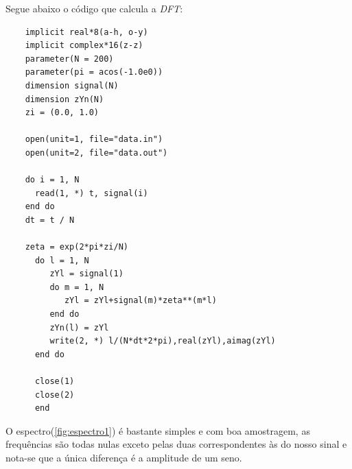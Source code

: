 \documentclass[a4paper, 11pt]{article}
\begin{document}
Segue abaixo o código que calcula a \emph{DFT}:
\begin{verbatim}
    implicit real*8(a-h, o-y)
    implicit complex*16(z-z)
    parameter(N = 200)
    parameter(pi = acos(-1.0e0))
    dimension signal(N)
    dimension zYn(N)
    zi = (0.0, 1.0)
    
    open(unit=1, file="data.in")
    open(unit=2, file="data.out")
    
    do i = 1, N
      read(1, *) t, signal(i)
    end do
    dt = t / N
    
    zeta = exp(2*pi*zi/N)
      do l = 1, N
         zYl = signal(1)
         do m = 1, N
            zYl = zYl+signal(m)*zeta**(m*l)
         end do
         zYn(l) = zYl
         write(2, *) l/(N*dt*2*pi),real(zYl),aimag(zYl)
      end do

      close(1)
      close(2)
      end
\end{verbatim}

O espectro(\ref{fig:espectro1}) é bastante simples e com boa amostragem, as frequências são todas nulas exceto pelas duas
correspondentes às do nosso sinal e nota-se que a única diferença é a amplitude de um seno.
\end{document}
